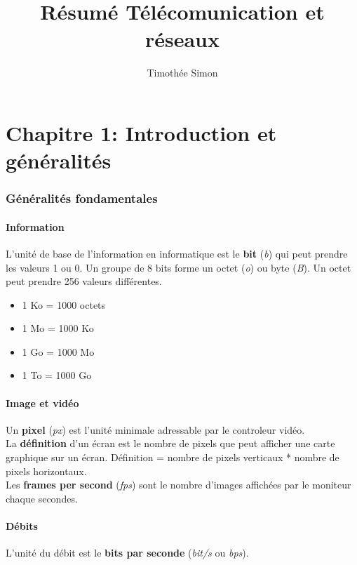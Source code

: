 \documentclass[10pt,a4paper]{article}
\author{Timothée Simon}
\title{Résumé Télécomunication et réseaux}
\begin{document}
 \part{Chapitre 1: Introduction et généralités}
 \section{Généralités fondamentales}

 \subsection{Information}
 L'unité de base de l'information en informatique est le \textbf{bit} (\textit{b}) qui peut prendre les valeurs 1 ou 0. Un groupe de 8 bits forme un octet (\textit{o}) ou byte (\textit{B}). Un octet peut prendre 256 valeurs différentes.
 \begin{itemize}
 	\item 1 Ko = 1000 octets
 	\item 1 Mo = 1000 Ko
 	\item 1 Go = 1000 Mo
	\item 1 To = 1000 Go
 \end{itemize}

 \subsection{Image et vidéo}
 Un \textbf{pixel} (\textit{px}) est l'unité minimale adressable par le controleur vidéo.\\
 \indent
 La \textbf{définition} d'un écran est le nombre de pixels que peut afficher une carte graphique sur un écran. Définition = nombre de pixels verticaux * nombre de pixels horizontaux.\\
 \indent
 Les \textbf{frames per second} (\textit{fps}) sont le nombre d'images affichées par le moniteur chaque secondes.

 \subsection{Débits}
 L'unité du débit est le \textbf{bits par seconde} (\textit{bit/s} ou \textit{bps}).
\end{document}
